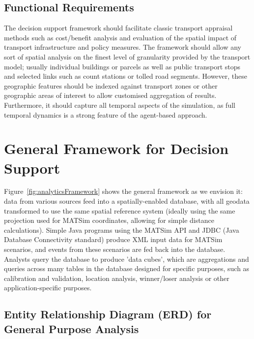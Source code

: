 \subsection{Functional Requirements}
The decision support framework should facilitate classic transport
appraisal methods such as cost/benefit analysis and evaluation of the spatial impact of transport infrastructure and policy measures. The framework should allow any sort of spatial analysis on the finest level of granularity provided by the transport model; usually individual buildings or parcels as well as public transport stops and selected links such as count stations or tolled road segments. However, these geographic features should be indexed against transport zones or other geographic areas of interest to allow customised aggregation of results. Furthermore, it should capture all temporal aspects of the simulation, as full temporal dynamics is a strong feature of the agent-based approach.

\section{General Framework for Decision Support}
Figure~\ref{fig:analyticsFramework} shows the general framework as we envision it: data from various sources feed into a spatially-enabled database, with all geodata transformed to use the same spatial reference system (ideally using the same projection used for MATSim coordinates, allowing for simple distance calculations). Simple Java programs using the MATSim API and JDBC (Java Database Connectivity standard) produce XML input data for MATSim scenarios, and events from these scenarios are fed back into the database. Analysts query the database to produce 'data cubes', which are aggregations and queries across many tables in the database designed for specific purposes, such as calibration and validation, location analysis, winner/loser analysis or other application-specific purposes.

\subsection{Entity Relationship Diagram (ERD) for General Purpose Analysis}

